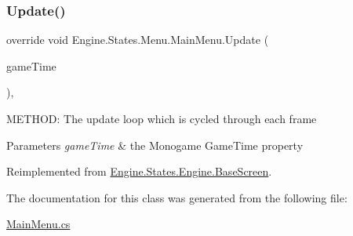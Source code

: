 \mbox{\label{a00574_ad667a7ff9dea79bee26a4205418c7a61}} 
\subsubsection{\texorpdfstring{Update()}{Update()}}
{\footnotesize\ttfamily override void Engine.\+States.\+Menu.\+Main\+Menu.\+Update (\begin{DoxyParamCaption}\item[{Game\+Time}]{game\+Time }\end{DoxyParamCaption})\hspace{0.3cm}{\ttfamily [inline]}, {\ttfamily [virtual]}}



M\+E\+T\+H\+OD\+: The update loop which is cycled through each frame 


\begin{DoxyParams}{Parameters}
{\em game\+Time} & the Monogame Game\+Time property\\
\hline
\end{DoxyParams}


Reimplemented from \hyperlink{a00550_a098ece7d1e112475f6e880c3a672af64}{Engine.\+States.\+Engine.\+Base\+Screen}.



The documentation for this class was generated from the following file\+:\begin{DoxyCompactItemize}
\item 
\hyperlink{a00212}{Main\+Menu.\+cs}\end{DoxyCompactItemize}
